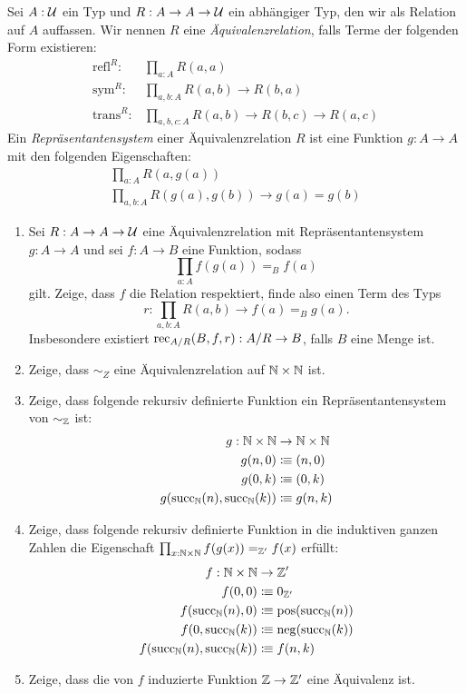 \documentclass{uebung}
\begin{document}
\begin{bonus}
  Sei $A:\mathcal{U}$ ein Typ und $R:A \to A \to \mathcal{U}$ ein abhängiger Typ, den wir als Relation auf $A$ auffassen.
  Wir nennen $R$ eine \emph{Äquivalenzrelation}, falls Terme der folgenden Form existieren:
  \begin{align*}
    \mathrm{refl}^R :   & \prod_{a:A} R(a,a)\\
    \mathrm{sym}^R :    & \prod_{a,b:A} R(a,b) \to R(b,a)\\
    \mathrm{trans}^R :  & \prod_{a,b,c:A} R(a,b) \to R(b,c) \to R(a,c)
  \end{align*}
  Ein \emph{Repräsentantensystem} einer Äquivalenzrelation $R$ ist eine Funktion $g:A \to A$ mit den folgenden Eigenschaften:
  \begin{gather*}
    \prod_{a:A} R(a,g(a))\\
    \prod_{a,b:A} R(g(a),g(b)) \to g(a) = g(b)
  \end{gather*}

  \begin{enumerate}
    \item Sei $R:A \to A \to\mathcal{U}$ eine Äquivalenzrelation mit Repräsentantensystem $g:A \to A$ und sei $f:A \to B$ eine Funktion, sodass
      $$
      \prod_{a:A} f(g(a)) =_B f(a)
      $$
      gilt.
      Zeige, dass $f$ die Relation respektiert, finde also einen Term des Typs
      $$
      r:\prod_{a,b:A} R(a,b) \to f(a) =_B g(a).
      $$
      Insbesondere existiert $\mathrm{rec}_{A/R}(B,f,r):A/R\to B$, falls $B$ eine Menge ist.
    \item Zeige, dass $\sim_Z$ eine Äquivalenzrelation auf $\mathbb{N}\times\mathbb{N}$ ist.
    \item Zeige, dass folgende rekursiv definierte Funktion ein Repräsentantensystem von $\sim_{\mathbb{Z}}$ ist:
      \begin{align*}
        g : \mathbb{N}\times\mathbb{N} &\to \mathbb{N}\times\mathbb{N}\\
        g(n,0) &\vcentcolon\mspace{-1.2mu}\equiv (n,0)\\
        g(0,k) &\vcentcolon\mspace{-1.2mu}\equiv (0,k)\\
        g(\mathrm{succ}_{\mathbb{N}}(n),\mathrm{succ}_{\mathbb{N}}(k)) &\vcentcolon\mspace{-1.2mu}\equiv g(n,k)
      \end{align*}
    \item Zeige, dass folgende rekursiv definierte Funktion in die induktiven ganzen Zahlen die Eigenschaft $\prod_{x:\mathbb{N}\times \mathbb{N}} f(g(x)) =_{\mathbb{Z}'} f(x)$ erfüllt:
      \begin{align*}
        f:\mathbb{N}\times\mathbb{N} &\to \mathbb{Z}'\\
        f(0,0)       &\vcentcolon\mspace{-1.2mu}\equiv 0_{\mathbb{Z}'}\\
        f(\mathrm{succ}_{\mathbb{N}}(n),0) &\vcentcolon\mspace{-1.2mu}\equiv \mathrm{pos}(\mathrm{succ}_{\mathbb{N}}(n))\\
        f(0,\mathrm{succ}_{\mathbb{N}}(k)) &\vcentcolon\mspace{-1.2mu}\equiv \mathrm{neg}(\mathrm{succ}_{\mathbb{N}}(k))\\
        f(\mathrm{succ}_{\mathbb{N}}(n),\mathrm{succ}_{\mathbb{N}}(k)) &\vcentcolon\mspace{-1.2mu}\equiv f(n,k)
      \end{align*}
    \item Zeige, dass die von $f$ induzierte Funktion $\mathbb{Z}\to\mathbb{Z}'$ eine Äquivalenz ist.
  \end{enumerate}
\end{bonus}

\begin{exercise}
\end{exercise}
\end{document}
